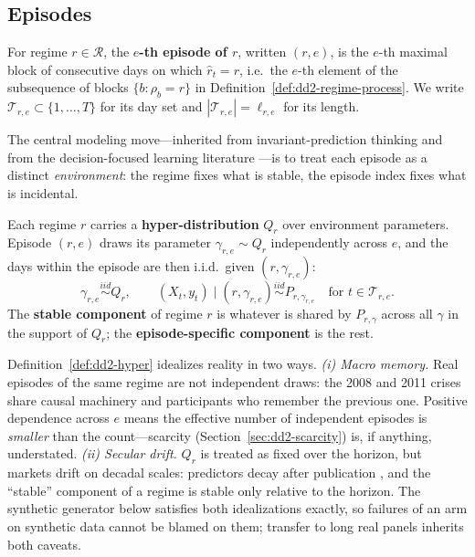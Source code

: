 \subsection{Episodes}

\begin{definition}[Episode]
\label{def:dd2-episode}
For regime $r \in \mathcal{R}$, the \textbf{$e$-th episode of $r$}, written
$(r, e)$, is the $e$-th maximal block of consecutive days on which
$\hat r_t = r$, i.e.\ the $e$-th element of the subsequence of blocks
$\{b : \rho_b = r\}$ in Definition~\ref{def:dd2-regime-process}. We write
$\mathcal{T}_{r,e} \subset \{1, \ldots, T\}$ for its day set and
$|\mathcal{T}_{r,e}| = \ell_{r,e}$ for its length.
\end{definition}

The central modeling move---inherited from invariant-prediction thinking and
from the decision-focused learning literature
\citep{elmachtoub2022smart, yan2026invpnco}---is to treat each episode as a
distinct \emph{environment}: the regime fixes what is stable, the episode
index fixes what is incidental.

\begin{definition}
\label{def:dd2-hyper}
Each regime $r$ carries a \textbf{hyper-distribution} $Q_r$ over environment
parameters. Episode $(r,e)$ draws its parameter
$\gamma_{r,e} \sim Q_r$ independently across $e$, and the days within the
episode are then i.i.d.\ given $(r, \gamma_{r,e})$:
\[
\gamma_{r,e} \stackrel{iid}{\sim} Q_r, \qquad
(X_t, y_t) \mid (r, \gamma_{r,e}) \stackrel{iid}{\sim} P_{r, \gamma_{r,e}}
\quad \text{for } t \in \mathcal{T}_{r,e}.
\]
The \textbf{stable component} of regime $r$ is whatever is shared by
$P_{r,\gamma}$ across all $\gamma$ in the support of $Q_r$; the
\textbf{episode-specific component} is the rest.
\end{definition}

\begin{remark}
\label{rem:dd2-idealizations}
Definition~\ref{def:dd2-hyper} idealizes reality in two ways.
\emph{(i) Macro memory.} Real episodes of the same regime are not independent
draws: the 2008 and 2011 crises share causal machinery and participants who
remember the previous one. Positive dependence across $e$ means the effective
number of independent episodes is \emph{smaller} than the count---scarcity
(Section~\ref{sec:dd2-scarcity}) is, if anything, understated.
\emph{(ii) Secular drift.} $Q_r$ is treated as fixed over the horizon, but
markets drift on decadal scales: predictors decay after publication
\citep{mclean2016does}, and the ``stable'' component of a regime is stable
only relative to the horizon. The synthetic generator below satisfies both
idealizations exactly, so failures of an arm on synthetic data cannot be
blamed on them; transfer to long real panels inherits both caveats.
\end{remark}

